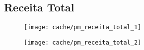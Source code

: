 
\subsection{Receita Total}





\begin{figure}[H]
\center
\texttt{[image: cache/pm\_receita\_total\_1]}
\end{figure}

\begin{figure}[H]
\center
\texttt{[image: cache/pm\_receita\_total\_2]}
\end{figure}
